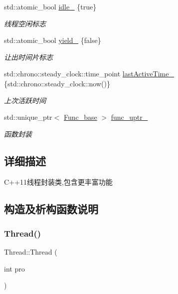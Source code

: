 \begin{DoxyCompactItemize}
std\+::atomic\+\_\+bool \hyperlink{classThread_a13aa04a60328060dec3a25b286c933a2}{idle\+\_\+} \{true\}
\begin{DoxyCompactList}\small\item\em 线程空闲标志 \end{DoxyCompactList}\item 
\mbox{\label{classThread_a535df3b8fc4ff9ca48f5a6d561162a36}} 
std\+::atomic\+\_\+bool \hyperlink{classThread_a535df3b8fc4ff9ca48f5a6d561162a36}{yield\+\_\+} \{false\}
\begin{DoxyCompactList}\small\item\em 让出时间片标志 \end{DoxyCompactList}\item 
\mbox{\label{classThread_ae7ed71c6b1f7782ecd4186005fd70760}} 
std\+::chrono\+::steady\+\_\+clock\+::time\+\_\+point \hyperlink{classThread_ae7ed71c6b1f7782ecd4186005fd70760}{last\+Active\+Time\+\_\+} \{std\+::chrono\+::steady\+\_\+clock\+::now()\}
\begin{DoxyCompactList}\small\item\em 上次活跃时间 \end{DoxyCompactList}\item 
\mbox{\label{classThread_a677202a7d90ebc5a6d4f8b1eab1a1eac}} 
std\+::unique\+\_\+ptr$<$ \hyperlink{structThread_1_1Func__base}{Func\+\_\+base} $>$ \hyperlink{classThread_a677202a7d90ebc5a6d4f8b1eab1a1eac}{func\+\_\+uptr\+\_\+}
\begin{DoxyCompactList}\small\item\em 函数封装 \end{DoxyCompactList}\end{DoxyCompactItemize}


\subsection{详细描述}
C++11线程封装类,包含更丰富功能 

\subsection{构造及析构函数说明}
\mbox{\label{classThread_a66350772ff3af06962db113658a72ae3}} 
\subsubsection{\texorpdfstring{Thread()}{Thread()}\hspace{0.1cm}{\footnotesize\ttfamily [1/3]}}
{\footnotesize\ttfamily Thread\+::\+Thread (\begin{DoxyParamCaption}\item[{int}]{pro }\end{DoxyParamCaption})\hspace{0.3cm}{\ttfamily [inline]}}



